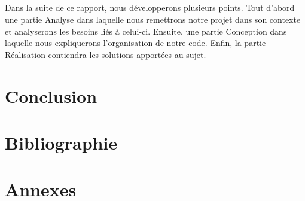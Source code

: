 \documentclass[12pt,a4paper]{report}
\begin{document}
\paragraph*{}
Dans la suite de ce rapport, nous développerons plusieurs points. Tout d'abord une partie Analyse dans laquelle nous remettrons notre projet dans son contexte et analyserons les besoins liés à celui-ci. Ensuite, une partie Conception dans laquelle nous expliquerons l'organisation de notre code. Enfin, la partie Réalisation contiendra les solutions apportées au sujet.







\chapter*{Conclusion}

\chapter*{Bibliographie}

\chapter*{Annexes}


\end{document}
